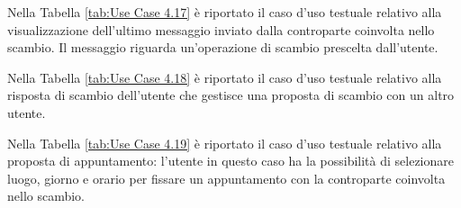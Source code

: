 Nella Tabella \ref{tab:Use Case 4.17} è riportato il caso d'uso testuale relativo alla visualizzazione dell'ultimo messaggio inviato dalla controparte coinvolta nello scambio. Il messaggio riguarda un'operazione di scambio prescelta dall'utente.\bigskip

Nella Tabella \ref{tab:Use Case 4.18} è riportato il caso d'uso testuale relativo alla risposta di scambio dell'utente che gestisce una proposta di scambio con un altro utente.\bigskip

Nella Tabella \ref{tab:Use Case 4.19} è riportato il caso d'uso testuale relativo alla proposta di appuntamento: l'utente in questo caso ha la possibilità di selezionare luogo, giorno e orario per fissare un appuntamento con la controparte coinvolta nello scambio.\bigskip 
